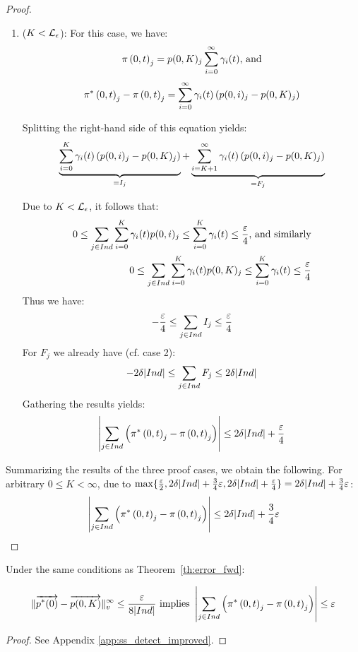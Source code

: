\documentclass{entcs}
\begin{document}
{\begin{proof}
\begin{enumerate}
					By gathering all results, we obtain:
					 \[
						\left| \sum_{j \in \Ind} \left( \pipOtj - \piOtj \right) \right| \leq 2 \delta | \Ind | + \frac{3}{4} \varepsilon
					\]
					
				\item ($K < \mathcal{L}_{\epsilon}$): For this case, we have:
					\[
						\pi \left(0, t \right )_{j} = p(0,K)_{j} \sum_{i=0}^{\infty} \gamma_{i}(t) \text{, and}
					\]
					\[
						\pi^{*} \left(0, t \right )_{j} - \pi \left(0, t \right )_{j} = \sum_{i=0}^{\infty} \gamma_{i}(t) \left( p(0,i)_{j} - p(0,K)_{j} \right)
					\]
						
						Splitting the right-hand side of this equation yields:
					\[
						\underbrace{\sum_{i=0}^{K} \gamma_{i}(t) \left( p(0,i)_{j} - p(0,K)_{j} \right)}_{=I_{j}} + \underbrace{\sum_{i=K+1}^{\infty} \gamma_{i}(t) \left( p(0,i)_{j} - p(0,K)_{j} \right)}_{=F_{j}}
					\]

					Due to $K < \mathcal{L}_{\epsilon}$, it follows that:
					\begin{eqnarray}
						0 \leq \sum_{j \in Ind} \sum_{i=0}^{K} \gamma_{i}(t) p(0,i)_{j} \leq \sum_{i=0}^{K} \gamma_{i}(t) \leq \frac{\varepsilon}{4} \nonumber \text{, and similarly}\\
						0 \leq \sum_{j \in Ind} \sum_{i=0}^{K} \gamma_{i}(t) p(0,K)_{j} \leq \sum_{i=0}^{K} \gamma_{i}(t) \leq \frac{\varepsilon}{4} \nonumber
					\end{eqnarray}
					Thus we have:
					\[
						-\frac{\varepsilon}{4} \leq \sum_{j \in Ind} I_{j} \leq \frac{\varepsilon}{4}
					\]
					For $F_{j}$ we already have (cf. case 2):
					\[
						- 2 \delta |Ind| \leq \sum_{j \in Ind} F_{j} \leq 2 \delta |Ind|
					\]
					Gathering the results yields:
					\[
						\left| \sum_{j \in Ind} \left( \pi^{*} \left(0, t \right )_{j} - \pi \left(0, t \right )_{j} \right) \right| \leq 2 \delta |Ind| + \frac{\varepsilon}{4}
					\]
			\end{enumerate}
			Summarizing the results of the three proof cases, we obtain the following. For arbitrary $ 0 \leq K < \infty$, due to $\max\{ \frac{\varepsilon}{2}, 2 \delta | Ind | + \frac{3}{4} \varepsilon, 2 \delta |Ind| + \frac{\varepsilon}{4} \} = 2 \delta | Ind | + \frac{3}{4}\varepsilon$:
			\[
				\left| \sum_{j \in \Ind} \left( \pipOtj - \piOtj \right) \right| \leq 2 \delta | \Ind | + \frac{3}{4} \varepsilon
			\]
		\end{proof}
		}
		
		\begin{corollary}
			Under the same conditions as Theorem~\ref{th:error_fwd}:
			\begin{fframe}{0.98}{-0.2}
				\begin{equation}
					\lVert  \overrightarrow{p^{*}(0)} - \overrightarrow{p(0,K)}  \rVert_{v}^{\infty} \leq \frac{\varepsilon}{8 |Ind|} \text{ implies } \left| \sum_{j \in Ind} \left( \pi^{*} \left(0, t \right )_{j} - \pi \left(0, t \right )_{j} \right) \right| \leq \varepsilon \label{eq:our_fwd_cor}
				\end{equation}
			\end{fframe}
			\label{cl:error_fwd}
		\end{corollary}
		{\small
			\begin{proof}
				See Appendix \ref{app:ss_detect_improved}.
			\end{proof}
		}
		
\end{document}

